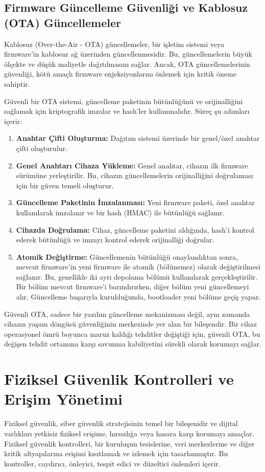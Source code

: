 \subsection{Firmware Güncelleme Güvenliği ve Kablosuz (OTA) Güncellemeler}

Kablosuz (Over-the-Air - OTA) güncellemeler, bir işletim sistemi veya firmware'in kablosuz ağ üzerinden güncellenmesidir. Bu, güncellemelerin büyük ölçekte ve düşük maliyetle dağıtılmasını sağlar. Ancak, OTA güncellemelerinin güvenliği, kötü amaçlı firmware enjeksiyonlarını önlemek için kritik öneme sahiptir.

Güvenli bir OTA sistemi, güncelleme paketinin bütünlüğünü ve orijinalliğini sağlamak için kriptografik imzalar ve hash'ler kullanmalıdır. Süreç şu adımları içerir:

\begin{enumerate}
    \item \textbf{Anahtar Çifti Oluşturma:} Dağıtım sistemi üzerinde bir genel/özel anahtar çifti oluşturulur.
    \item \textbf{Genel Anahtarı Cihaza Yükleme:} Genel anahtar, cihazın ilk firmware sürümüne yerleştirilir. Bu, cihazın güncellemelerin orijinalliğini doğrulaması için bir güven temeli oluşturur.
    \item \textbf{Güncelleme Paketinin İmzalanması:} Yeni firmware paketi, özel anahtar kullanılarak imzalanır ve bir hash (HMAC) ile bütünlüğü sağlanır.
    \item \textbf{Cihazda Doğrulama:} Cihaz, güncelleme paketini aldığında, hash'i kontrol ederek bütünlüğü ve imzayı kontrol ederek orijinalliği doğrular.
    \item \textbf{Atomik Değiştirme:} Güncellemenin bütünlüğü onaylandıktan sonra, mevcut firmware'in yeni firmware ile atomik (bölünemez) olarak değiştirilmesi sağlanır. Bu, genellikle iki ayrı depolama bölümü kullanılarak gerçekleştirilir. Bir bölüm mevcut firmware'i barındırırken, diğer bölüm yeni güncellemeyi alır. Güncelleme başarıyla kurulduğunda, bootloader yeni bölüme geçiş yapar.
\end{enumerate}
Güvenli OTA, sadece bir yazılım güncelleme mekanizması değil, aynı zamanda cihazın yaşam döngüsü güvenliğinin merkezinde yer alan bir bileşendir. Bir cihaz operasyonel ömrü boyunca maruz kaldığı tehditler değiştiği için, güvenli OTA, bu değişen tehdit ortamına karşı savunma kabiliyetini sürekli olarak korumayı sağlar.

\section{Fiziksel Güvenlik Kontrolleri ve Erişim Yönetimi}
Fiziksel güvenlik, siber güvenlik stratejisinin temel bir bileşenidir ve dijital varlıkları yetkisiz fiziksel erişime, hırsızlığa veya hasara karşı korumayı amaçlar. Fiziksel güvenlik kontrolleri, bir kuruluşun tesislerine, veri merkezlerine ve diğer kritik altyapılarına erişimi kısıtlamak ve izlemek için tasarlanmıştır. Bu kontroller, caydırıcı, önleyici, tespit edici ve düzeltici önlemleri içerir.

